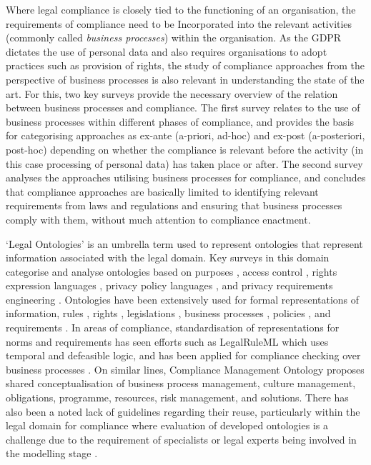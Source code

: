 Where legal compliance is closely tied to the functioning of an organisation, the requirements of compliance need to be Incorporated into the relevant activities (commonly called \textit{business processes}) within the organisation.
As the GDPR dictates the use of personal data and also requires organisations to adopt practices such as provision of rights, the study of compliance approaches from the perspective of business processes is also relevant in understanding the state of the art. 
For this, two key surveys provide the necessary overview of the relation between business processes and compliance. The first survey \cite{fellmann_state---art_2014} relates to the use of business processes within different phases of compliance, and provides the basis for categorising approaches as ex-ante (a-priori, ad-hoc) and ex-post (a-posteriori, post-hoc) depending on whether the compliance is relevant before the activity (in this case processing of personal data) has taken place or after. The second survey \cite{benyoucef_information_2015} analyses the approaches utilising business processes for compliance, and concludes that compliance approaches are basically limited to identifying relevant requirements from laws and regulations and ensuring that business processes comply with them, without much attention to compliance enactment.

`Legal Ontologies' is an umbrella term used to represent ontologies that represent information associated with the legal domain.
Key surveys in this domain categorise and analyse ontologies based on 
purposes \cite{leone_taking_2019,rodrigues_legal_2019}, 
access control \cite{kirrane_access_2016}, 
rights expression languages \cite{pellegrini_genealogy_2018}, 
privacy policy languages \cite{van_de_ven_qualitative_2016}, and
privacy requirements engineering \cite{gharib_ontologies_2016}.
Ontologies have been extensively used for formal representations of information, rules \cite{kirrane_scalable_2018}, rights \cite{pellegrini_genealogy_2018}, legislations \cite{leone_taking_2019}, business processes \cite{elgammal_formalizing_2016}, policies \cite{van_de_ven_qualitative_2016}, and requirements \cite{gharib_ontologies_2016}.
In areas of compliance, standardisation of representations for norms and requirements has seen efforts such as LegalRuleML \cite{palmirani_legalruleml_2011} which uses temporal and defeasible logic, and has been applied for compliance checking over business processes \cite{governatori_semantic_2016}. On similar lines, Compliance Management Ontology \cite{syed_abdullah_compliance_2012} proposes shared conceptualisation of business process management, culture management, obligations, programme, resources, risk management, and solutions.
There has also been a noted lack of guidelines regarding their reuse, particularly within the legal domain for compliance \cite{casanovas_legal_2017} where evaluation of developed ontologies is a challenge due to the requirement of specialists or legal experts being involved in the modelling stage \cite{rodrigues_legal_2019}.


